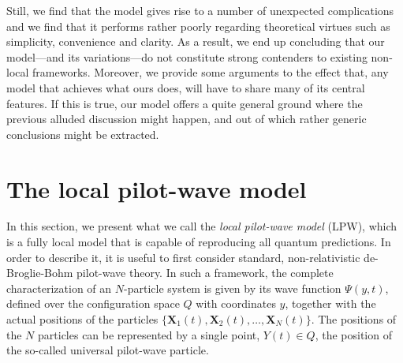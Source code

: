 \documentclass[letterpaper,12pt]{article}
\begin{document}
Still, we find that the model gives rise to a number of unexpected complications and we find that it performs rather poorly regarding theoretical virtues such as simplicity, convenience and clarity. As a result, we end up concluding that our model---and its variations---do not constitute strong contenders to existing non-local frameworks. Moreover, we provide some arguments to the effect that, any model that achieves what ours does, will have to share many of its central features. If this is true, our model offers a quite general ground where the previous alluded discussion might happen, and out of which rather generic conclusions might be extracted.

\section{The local pilot-wave model}
\label{Model}
In this section, we present what we call the \emph{local pilot-wave model} (LPW), which is a fully local model that is capable of reproducing all quantum predictions. In order to describe it, it is useful to first consider standard, non-relativistic de-Broglie-Bohm pilot-wave theory. In such a framework, the complete characterization of an $N$-particle system is given by its wave function $\Psi (y, t)$, defined over the configuration space $Q$ with coordinates $y$, together with the actual positions of the particles $\{\mathbf{X}_1 (t),\mathbf{X}_2 (t),\dots,\mathbf{X}_N (t)\}$. The positions of the $N$ particles can be represented by a single point, $Y (t) \in Q$, the position of the so-called universal pilot-wave particle.
\end{document}
